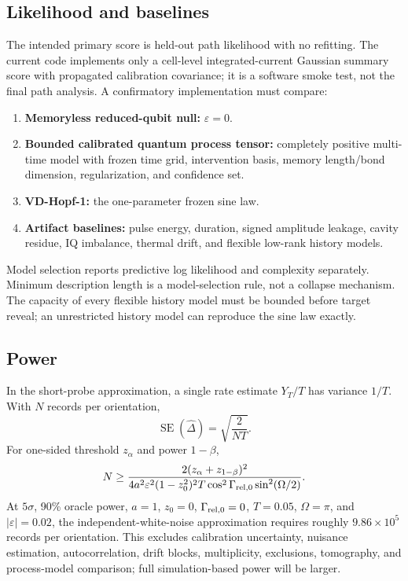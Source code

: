 \documentclass[10pt]{article}
\theoremstyle{definition}
\theoremstyle{remark}
\begin{document}
\subsection{Likelihood and baselines}

The intended primary score is held-out path likelihood with no refitting. The current code implements only a cell-level integrated-current Gaussian summary score with propagated calibration covariance; it is a software smoke test, not the final path analysis. A confirmatory implementation must compare:
\begin{enumerate}[label=(M\arabic*)]
\item \textbf{Memoryless reduced-qubit null:} \(\varepsilon=0\).
\item \textbf{Bounded calibrated quantum process tensor:} completely positive multi-time model with frozen time grid, intervention basis, memory length/bond dimension, regularization, and confidence set.
\item \textbf{VD-Hopf-1:} the one-parameter frozen sine law.
\item \textbf{Artifact baselines:} pulse energy, duration, signed amplitude leakage, cavity residue, IQ imbalance, thermal drift, and flexible low-rank history models.
\end{enumerate}
Model selection reports predictive log likelihood and complexity separately. Minimum description length is a model-selection rule, not a collapse mechanism. The capacity of every flexible history model must be bounded before target reveal; an unrestricted history model can reproduce the sine law exactly.

\subsection{Power}

In the short-probe approximation, a single rate estimate \(Y_T/T\) has variance \(1/T\). With \(N\) records per orientation,
\[
\operatorname{SE}(\widehat\Delta)=\sqrt{\frac{2}{NT}}.
\]
For one-sided threshold \(z_\alpha\) and power \(1-\beta\),
\begin{equation}
  N
  \ge
  \frac{2(z_\alpha+z_{1-\beta})^2}
  {4a^2\varepsilon^2(1-z_0^2)^2T
  \cos^2\Gamma_{{\rm rel},0}\sin^2(\Omega/2)}.
  \label{eq:power}
\end{equation}
At \(5\sigma\), 90\% oracle power, \(a=1\), \(z_0=0\), \(\Gamma_{{\rm rel},0}=0\), \(T=0.05\), \(\Omega=\pi\), and \(|\varepsilon|=0.02\), the independent-white-noise approximation requires roughly \(9.86\times10^5\) records per orientation. This excludes calibration uncertainty, nuisance estimation, autocorrelation, drift blocks, multiplicity, exclusions, tomography, and process-model comparison; full simulation-based power will be larger.
\end{document}
